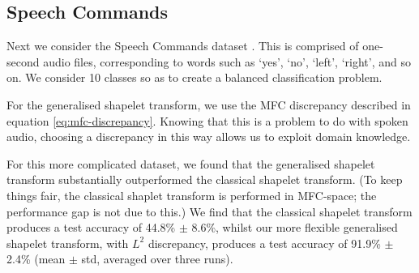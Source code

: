 \documentclass{article}
\theoremstyle{plain}
\theoremstyle{definition}
\begin{document}
\subsection{Speech Commands}
Next we consider the Speech Commands dataset \cite{warden2018speech}. This is comprised of one-second audio files, corresponding to words such as `yes', `no', `left', `right', and so on. We consider 10 classes so as to create a balanced classification problem.

For the generalised shapelet transform, we use the MFC discrepancy described in equation \eqref{eq:mfc-discrepancy}. Knowing that this is a problem to do with spoken audio, choosing a discrepancy in this way allows us to exploit domain knowledge.

For this more complicated dataset, we found that the generalised shapelet transform substantially outperformed the classical shapelet transform. (To keep things fair, the classical shaplet transform is performed in MFC-space; the performance gap is not due to this.) We find that  the classical shapelet transform produces a test accuracy of 44.8\% $\pm$ 8.6\%, whilst our more flexible generalised shapelet transform, with $L^2$ discrepancy, produces a test accuracy of 91.9\% $\pm$ 2.4\% (mean $\pm$ std, averaged over three runs).
\end{document}
